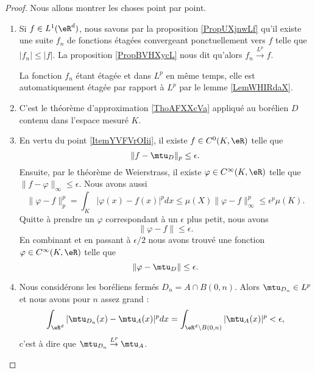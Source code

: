 \begin{proof}
   Nous allons montrer les choses point par point.
   \begin{enumerate}
       \item
           Si \( f\in L^1(\eR^d)\), nous savons par la proposition \ref{PropUXjnwLf} qu'il existe une suite \( f_n\) de fonctions étagées convergeant ponctuellement vers \( f\) telle que \( | f_n |\leq | f |\). La proposition \ref{PropBVHXycL} nous dit qu'alors \( f_n\stackrel{L^p}{\to}f\).

           La fonction \( f_n\) étant étagée et dans \( L^p\) en même temps, elle est automatiquement étagée par rapport à \( L^p\) par le lemme \ref{LemWHIRdaX}.

       \item\label{ItemYVFVrOIi}

           C'est le théorème d'approximation \ref{ThoAFXXcVa} appliqué au borélien \( D\) contenu dans l'espace mesuré \( K\).

       \item
            
           En vertu du point \ref{ItemYVFVrOIii}, il existe \( f\in C^0(K,\eR)\) telle que 
           \begin{equation}
             \| f-\mtu_D \|_p\leq \epsilon. 
           \end{equation}
           Ensuite, par le théorème de Weierstrass, il existe \( \varphi\in C^{\infty}(K,\eR)\) telle que \( \| f-\varphi \|_{\infty}\leq \epsilon\). Nous avons aussi
           \begin{equation}
               \| \varphi-f \|^p_p=\int_K| \varphi(x)-f(x) |^pdx\leq\mu(X)\| \varphi-f \|_{\infty}^p\leq \epsilon^p\mu(K).
           \end{equation}
           Quitte à prendre un \( \varphi\) correspondant à un \( \epsilon\) plus petit, nous avons
           \begin{equation}
               \| \varphi-f \|\leq \epsilon.
           \end{equation}
           En combinant et en passant à \( \epsilon/2\) nous avons trouvé une fonction \( \varphi\in  C^{\infty}(K,\eR)\) telle que
           \begin{equation}
               \| \varphi-\mtu_D \|\leq \epsilon.
           \end{equation}

       \item

           Nous considérons les boréliens fermés \( D_n=A\cap B(0,n)\). Alors \( \mtu_{D_n}\in L^p\) et nous avons pour \( n\) assez grand :
           \begin{equation}
               \int_{\eR^d}| \mtu_{D_n}(x)-\mtu_{A}(x) |^pdx=\int_{\eR^d\setminus B(0,n)}| \mtu_A(x) |^p<\epsilon,
           \end{equation}
           c'est à dire que \( \mtu_{D_n}\stackrel{L^p}{\to}\mtu_A\).


\end{enumerate}
\end{proof}
